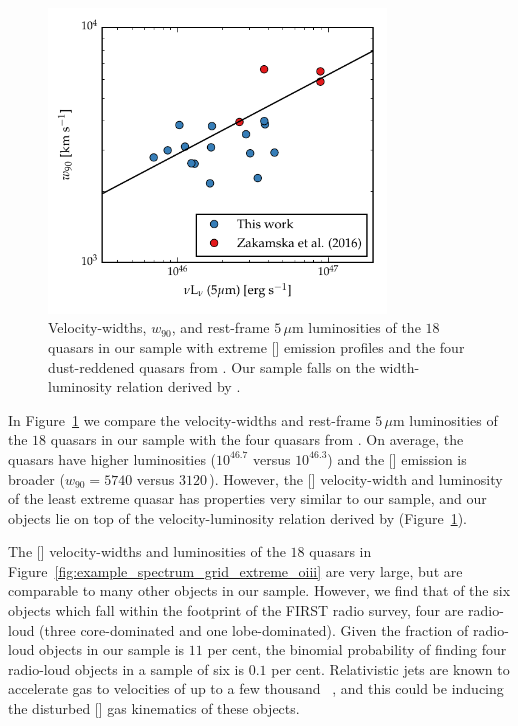 \begin{figure}
\centering
    \includegraphics[width=0.8\textwidth]{figures/chapter04/fivemicron_w90.pdf}
    \caption[{Velocity-widths and rest-frame $5$\,$\mu$m luminosities of the $18$ quasars in sample with extreme [] emission profiles and the four dust-reddened quasars from \citet{zakamska16}.}]{Velocity-widths, $w_{90}$, and rest-frame $5$\,$\mu$m luminosities of the $18$ quasars in our sample with extreme [] emission profiles and the four dust-reddened quasars from \citet{zakamska16}. Our sample falls on the width-luminosity relation derived by \citet{zakamska16}.}
    \label{fig:fivemicron_w90}
\end{figure}

In Figure~\ref{fig:fivemicron_w90} we compare the velocity-widths and rest-frame $5$\,$\mu$m luminosities of the $18$ quasars in our sample with the four quasars from \citet{zakamska16}.
On average, the \citet{zakamska16} quasars have higher luminosities ($10^{46.7}$ versus $10^{46.3}$\ergs) and the [] emission is broader ($w_{90}=5740$ versus $3120$\,\kms).
However, the [] velocity-width and luminosity of the least extreme \citet{zakamska16} quasar has properties very similar to our sample, and our objects lie on top of the velocity-luminosity relation derived by \citet{zakamska16} (Figure~\ref{fig:fivemicron_w90}).

The [] velocity-widths and luminosities of the $18$ quasars in Figure~\ref{fig:example_spectrum_grid_extreme_oiii} are very large, but are comparable to many other objects in our sample.
However, we find that of the six objects which fall within the footprint of the FIRST radio survey, four are radio-loud (three core-dominated and one lobe-dominated).
Given the fraction of radio-loud objects in our sample is $11$ per cent, the binomial probability of finding four radio-loud objects in a sample of six is $0.1$ per cent.
Relativistic jets are known to accelerate gas to velocities of up to a few thousand \kms\, \citep[e.g.][]{nesvadba06,nesvadba08}, and this could be inducing the disturbed [] gas kinematics of these objects.

